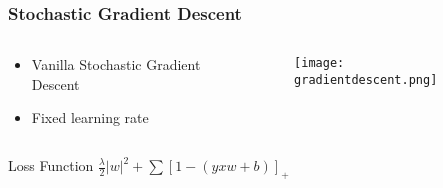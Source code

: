 \begin{frame}
	\frametitle{Stochastic Gradient Descent}
	\begin{columns}
		\begin{column}{0.5\textwidth}
			\begin{itemize}
				\item Vanilla Stochastic Gradient Descent
				\item Fixed learning rate
			\end{itemize}
		\end{column}
		\begin{column}{0.5\textwidth}  %
			\begin{figure}
				\texttt{[image: gradientdescent.png]}
			\end{figure}
		\end{column}
	\end{columns}
	
	\begin{block}{Loss Function}
		\centering
		$\frac{\lambda}{2}|w|^2+\sum[1-(yxw+b)]_+$
	\end{block}
\end{frame}

